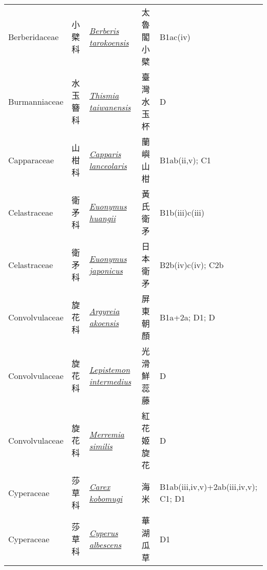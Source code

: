 {\begin{longtable}{p{2.5cm}p{2.5cm}p{4.5cm}p{2.5cm}p{3cm}}
    Berberidaceae & 小檗科 & \href{http://www.theplantlist.org/tpl1.1/search?q=Berberis+tarokoensis}{\textit{Berberis tarokoensis} } & 太魯閣小檗 & B1ac(iv) \index{Berberis@\textit{Berberis}!tarokoensis@\textit{tarokoensis}}  \index{太魯閣小檗} \\
    Burmanniaceae & 水玉簪科 & \href{http://www.theplantlist.org/tpl1.1/search?q=Thismia+taiwanensis}{\textit{Thismia taiwanensis} } & 臺灣水玉杯 & D \index{Thismia@\textit{Thismia}!taiwanensis@\textit{taiwanensis}}  \index{臺灣水玉杯} \\
    Capparaceae & 山柑科 & \href{http://www.theplantlist.org/tpl1.1/search?q=Capparis+lanceolaris}{\textit{Capparis lanceolaris} } & 蘭嶼山柑 & B1ab(ii,v); C1 \index{Capparis@\textit{Capparis}!lanceolaris@\textit{lanceolaris}}  \index{蘭嶼山柑} \\
    Celastraceae & 衛矛科 & \href{http://www.theplantlist.org/tpl1.1/search?q=Euonymus+huangii}{\textit{Euonymus huangii} } & 黃氏衛矛 & B1b(iii)c(iii) \index{Euonymus@\textit{Euonymus}!huangii@\textit{huangii}}  \index{黃氏衛矛} \\
    Celastraceae & 衛矛科 & \href{http://www.theplantlist.org/tpl1.1/search?q=Euonymus+japonicus}{\textit{Euonymus japonicus} } & 日本衛矛 & B2b(iv)c(iv); C2b \index{Euonymus@\textit{Euonymus}!japonicus@\textit{japonicus}}  \index{日本衛矛} \\
    Convolvulaceae & 旋花科 & \href{http://www.theplantlist.org/tpl1.1/search?q=Argyreia+akoensis}{\textit{Argyreia akoensis} } & 屏東朝顏 & B1a+2a; D1; D \index{Argyreia@\textit{Argyreia}!akoensis@\textit{akoensis}}  \index{屏東朝顏} \\
    Convolvulaceae & 旋花科 & \href{http://www.theplantlist.org/tpl1.1/search?q=Lepistemon+intermedius}{\textit{Lepistemon intermedius} } & 光滑鮮蕊藤 & D \index{Lepistemon@\textit{Lepistemon}!intermedius@\textit{intermedius}}  \index{光滑鮮蕊藤} \\
    Convolvulaceae & 旋花科 & \href{http://www.theplantlist.org/tpl1.1/search?q=Merremia+similis}{\textit{Merremia similis} } & 紅花姬旋花 & D \index{Merremia@\textit{Merremia}!similis@\textit{similis}}  \index{紅花姬旋花} \\
    Cyperaceae & 莎草科 & \href{http://www.theplantlist.org/tpl1.1/search?q=Carex+kobomugi}{\textit{Carex kobomugi} } & 海米 & B1ab(iii,iv,v)+2ab(iii,iv,v); C1; D1 \index{Carex@\textit{Carex}!kobomugi@\textit{kobomugi}}  \index{海米} \\
    Cyperaceae & 莎草科 & \href{http://www.theplantlist.org/tpl1.1/search?q=Cyperus+albescens}{\textit{Cyperus albescens} } & 華湖瓜草 & D1 \index{Cyperus@\textit{Cyperus}!albescens@\textit{albescens}}  \index{華湖瓜草} \\

\end{longtable}}
